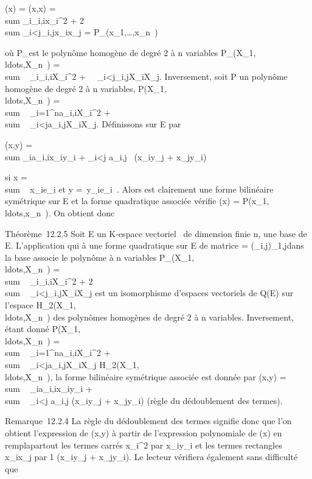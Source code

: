 \documentclass[]{article}
\begin{document}
\Phi(x) = \phi(x,x) = \\sum
_i\omega_i,ix_i^2 +
2\\sum
_i<j\omega_i,jx_ix_j =
P_\Phi(x_1,\ldots,x_n~)

où P_\Phi est le polynôme homogène de degré 2 à n variables
P_\Phi(X_1,\\ldots,X_n~)
= \\sum ~
_i\omega_i,iX_i^2 +\
\sum ~
_i<j\omega_i,jX_iX_j.
Inversement, soit P un polynôme homogène de degré 2 à n variables,
P(X_1,\\ldots,X_n~)
= \\sum ~
_i=1^na_i,iX_i^2
+ \\sum ~
_i<ja_i,jX_iX_j. Définissons
\phi sur E par

\phi(x,y) = \\sum
_ia_i,ix_iy_i +
\sum _i<j a_i,j~
 (x_iy_j +
x_jy_i)

si x = \\sum ~
x_ie_i et y =\
\sum  y_ie_i~. Alors \phi est
clairement une forme bilinéaire symétrique sur E et la forme quadratique
associée vérifie \Phi(x) =
P(x_1,\\ldots,x_n~).
On obtient donc

Théorème~12.2.5 Soit E un K-espace vectoriel ~de dimension finie n, 
une base de E. L'application qui à une forme quadratique \Phi sur E de
matrice \Omega = (\omega_i,j)_1\leqi,j\leqn dans la base \mathcal{E} associe le
polynôme à n variables
P_\Phi(X_1,\\ldots,X_n~)
= \\sum ~
_i\omega_i,iX_i^2 +
2\\sum ~
_i<j\omega_i,jX_iX_j est un
isomorphisme d'espaces vectoriels de Q(E) sur l'espace
H_2(X_1,\\ldots,X_n~)
des polynômes homogènes de degré 2 à n variables. Inversement, étant
donné
P(X_1,\\ldots,X_n~)
= \\sum ~
_i=1^na_i,iX_i^2
+ \\sum ~
_i<ja_i,jX_iX_j \in
H_2(X_1,\\ldots,X_n~),
la forme bilinéaire symétrique associée est donnée par \phi(x,y)
= \\sum ~
_ia_i,ix_iy_i
+ \\sum ~
_i<j a_i,j 
(x_iy_j + x_jy_i) (règle du
dédoublement des termes).

Remarque~12.2.4 La règle du dédoublement des termes signifie donc que
l'on obtient l'expression de \phi(x,y) à partir de l'expression polynomiale
de \Phi(x) en rempla\ccant partout les termes carrés
x_i^2 par x_iy_i et les termes
rectangles x_ix_j par  1 \over 2
(x_iy_j + x_jy_i). Le lecteur
vérifiera également sans difficulté que
\end{document}
